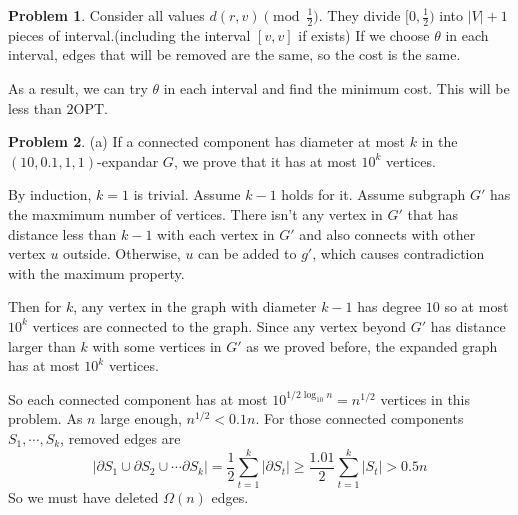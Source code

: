 \documentclass[a4paper]{article}
\theoremstyle{definition}
\newtheorem{problem}{Problem}
\theoremstyle{plain}
\newcommand{\<}{\left<}
\renewcommand{\>}{\right>}
\newcommand{\OPT}{\mathrm{OPT}}
\numberwithin{equation}{problem}
\begin{document}
\begin{problem}
  Consider all values  $ d(r,v)\pmod {\frac{1}{2}} $. They divide  $ [0,\frac{1}{2}) $ into  $ |V|+1 $ pieces of interval.(including the interval  $ [v,v] $ if exists) If we choose  $ \theta $ in each interval, edges that will be removed are the same, so the cost is the same.
  
  As a result, we can try  $ \theta $ in each interval and find the minimum cost. This will be less than  $ 2\OPT $.  
\end{problem}
\begin{problem}
  (a) If a connected component has diameter at most  $ k $ in the  $ (10,0.1,1,1) $-expandar  $ G $, we prove that it has at most  $ 10^k $ vertices.
  
  By induction,  $ k=1 $ is trivial. Assume  $ k-1 $ holds for it. Assume subgraph  $ G' $ has the maxmimum number of vertices. There isn't any vertex in  $ G' $ that has distance less than  $ k-1 $ with each vertex  in $ G' $ and also connects with other vertex $ u $  outside. Otherwise,  $ u $ can be added to  $ g' $, which causes contradiction with the maximum property.
  
Then for  $ k $, any vertex in the graph with diameter  $ k-1 $ has degree  $ 10 $ so at most  $ 10^k $ vertices are connected to the graph. Since  any vertex beyond  $ G' $ has distance larger than  $ k $ with   some vertices in  $ G' $  as we proved before, the expanded graph has at most  $ 10^k $ vertices.

So each connected component has at most  $ 10^{1/2\log_{10}n}=n^{1/2} $ vertices in this problem.
As  $ n $ large enough,  $ n^{1/2}<0.1n $. For those connected components  $ S_1,\cdots,S_k $, removed edges are 
\[|\partial S_1\cup \partial S_2\cup\cdots\partial S_k|=\frac{1}{2}\sum_{t=1}^k|\partial S_t| \geq \frac{1.01}{2}\sum_{t=1}^k|S_t|>0.5 n\]
So we must have deleted  $ \Omega(n) $ edges.   




\end{problem}
\end{document}
